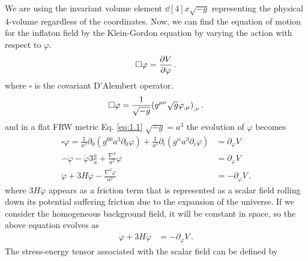 We are using the invariant volume element \(\dd[4]{x} \sqrt{-g}\)
representing the physical 4-volume regardless of the coordinates.
Now, we can find the equation of motion for the inflaton field by the Klein-Gordon equation by varying the action with respect to $\varphi$.
\begin{align}
    \square \varphi = \pdv{V}{\varphi }\,. \label{1.2.11}
\end{align}
where $\square$ is the covariant D'Alembert operator.
\begin{align}
    \square \varphi = \frac{1}{\sqrt{-g}} \qty(g^{\mu \nu } \sqrt{g} \varphi_{, \mu })_{, \nu }\,.\label{1.2.12}
\end{align}
and in a flat FRW metric Eq. \eqref{eq:1.1} $\sqrt{-g} = a^3$ the evolution of $\varphi$ becomes
\begin{align}
    \square \varphi = \frac{1}{a^3} \partial_0 (g^{00} a^3\partial_0\varphi) + \frac{1}{a^3} \partial_i (g^{ii} a^3\partial_i\varphi) 
    &= \partial _{\varphi} V  \\ - \ddot{\varphi} - \dot{\varphi} 3\frac{\dot{a}}{a} + \frac{\nabla^2}{a^2} \varphi  
    &= \partial _{\varphi} V  \\ \ddot{\varphi} + 3 H \dot{\varphi} - \frac{\nabla^2 \varphi }{a^2} &= - \partial _{\varphi} V\,. \label{1.2.15}
\end{align}
where $3H\ddot{\varphi}$ appears as a friction term that is represented as a scalar field rolling down its potential suffering friction due to the expansion of the universe. If we consider the homogeneous background field, it will be constant in space, so  the above equation evolves as\\
\begin{align}
     \ddot{\varphi} + 3 H \dot{\varphi}  &= - \partial _{\varphi} V\,. \label{1.2.16}
\end{align}
The stress-energy tensor associated with the scalar field can be defined by 

